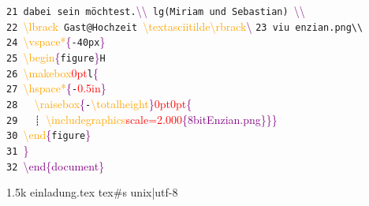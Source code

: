 \documentclass[12pt, a5paper]{article}
\newcommand{\red}[1]{\textcolor{red}{#1}}
\newcommand{\orange}[1]{\textcolor{orange}{#1}}
\newcommand{\purple}[1]{\textcolor{purple}{#1}}
\begin{document}
{ \verb!21 dabei sein möchtest.!\purple{\textbackslash\textbackslash}\verb! lg(Miriam und Sebastian) !\purple{\textbackslash\textbackslash}\\
 \verb!22 !\orange{\textbackslash lbrack}\verb! Gast@Hochzeit !\orange{\textbackslash textasciitilde\textbackslash rbrack}\purple{\textbackslash\textdollar}
 \verb!23 viu enzian.png\\!\\
 \verb!24 !\orange{\textbackslash vspace*}\purple{\{}\verb!-40px!\purple{\}}\\
 \verb!25 !\orange{\textbackslash begin}\purple{\{}\verb!figure!\purple{\}\lbrack}\verb!H!\purple{\rbrack}\\
 \verb!26 !\orange{\textbackslash makebox}\purple{\lbrack}\red{0pt}\purple{\rbrack\lbrack}\verb!l!\purple{\rbrack\{}\\
 \verb!27 !\orange{\textbackslash hspace*}\purple{\{}\verb!-!\red{0.5in}\purple{\}}\\
 \verb!28   !\orange{\textbackslash raisebox}\purple{\{}\verb!-!\orange{\textbackslash totalheight}\purple{\}\lbrack}\red{0pt}\purple{\rbrack\lbrack}\red{0pt}\purple{\rbrack\{}\\
 \verb!29   ┊ !\orange{\textbackslash includegraphics}\purple{\lbrack}\red{scale=2.000}\purple{\rbrack\{8bitEnzian.png\}\}\}}\\
 \verb!30 !\orange{\textbackslash end}\purple{\{}\verb!figure!\purple{\}}\\
 \verb!31 !\purple{\}}\\
 \verb!32 !\purple{\textbackslash end\{document\}}\\
 \mbox{}
\vfill
\begin{tcolorbox}
\newcommand{\grey}{\color{grey}}
1.5k einladung.tex tex\#s unix|utf-8
\end{tcolorbox}

}
\end{document}
